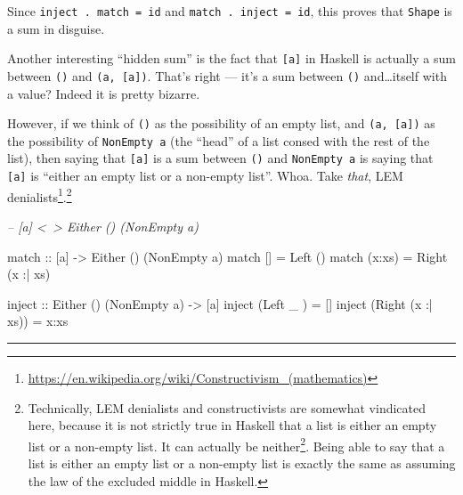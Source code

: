 \documentclass[]{article}
\newenvironment{Shaded}{}{}
\newcommand{\CommentTok}[1]{\textcolor[rgb]{0.38,0.63,0.69}{\textit{#1}}}
\newcommand{\DataTypeTok}[1]{\textcolor[rgb]{0.56,0.13,0.00}{#1}}
\newcommand{\FunctionTok}[1]{\textcolor[rgb]{0.02,0.16,0.49}{#1}}
\newcommand{\NormalTok}[1]{#1}
\newcommand{\OtherTok}[1]{\textcolor[rgb]{0.00,0.44,0.13}{#1}}
\renewcommand{\href}[2]{#2\footnote{\url{#1}}}
\begin{document}
Since \texttt{inject\ .\ match\ =\ id} and \texttt{match\ .\ inject\ =\ id},
this proves that \texttt{Shape} is a sum in disguise.

Another interesting ``hidden sum'' is the fact that \texttt{{[}a{]}} in Haskell
is actually a sum between \texttt{()} and \texttt{(a,\ {[}a{]})}. That's right
--- it's a sum between \texttt{()} and\ldots{}itself with a value? Indeed it is
pretty bizarre.

However, if we think of \texttt{()} as the possibility of an empty list, and
\texttt{(a,\ {[}a{]})} as the possibility of \texttt{NonEmpty\ a} (the ``head''
of a list consed with the rest of the list), then saying that \texttt{{[}a{]}}
is a sum between \texttt{()} and \texttt{NonEmpty\ a} is saying that
\texttt{{[}a{]}} is ``either an empty list or a non-empty list''. Whoa. Take
\emph{that},
\href{https://en.wikipedia.org/wiki/Constructivism_(mathematics)}{LEM
denialists}.\footnote{Technically, LEM denialists and constructivists are
  somewhat vindicated here, because it is not strictly true in Haskell that a
  list is either an empty list or a non-empty list. It can actually
  \href{https://wiki.haskell.org/Bottom}{be neither}. Being able to say that a
  list is either an empty list or a non-empty list is exactly the same as
  assuming the law of the excluded middle in Haskell.}

\begin{Shaded}
\begin{Highlighting}[]
\CommentTok{-- [a] <~> Either () (NonEmpty a)}

\OtherTok{match ::}\NormalTok{ [a] }\OtherTok{->} \DataTypeTok{Either}\NormalTok{ () (}\DataTypeTok{NonEmpty}\NormalTok{ a)}
\NormalTok{match []     }\FunctionTok{=} \DataTypeTok{Left}\NormalTok{  ()}
\NormalTok{match (x}\FunctionTok{:}\NormalTok{xs) }\FunctionTok{=} \DataTypeTok{Right}\NormalTok{ (x }\FunctionTok{:|}\NormalTok{ xs)}

\OtherTok{inject ::} \DataTypeTok{Either}\NormalTok{ () (}\DataTypeTok{NonEmpty}\NormalTok{ a) }\OtherTok{->}\NormalTok{ [a]}
\NormalTok{inject (}\DataTypeTok{Left}\NormalTok{   _       ) }\FunctionTok{=}\NormalTok{ []}
\NormalTok{inject (}\DataTypeTok{Right}\NormalTok{ (x }\FunctionTok{:|}\NormalTok{ xs)) }\FunctionTok{=}\NormalTok{ x}\FunctionTok{:}\NormalTok{xs}
\end{Highlighting}
\end{Shaded}

\begin{center}\rule{0.5\linewidth}{\linethickness}\end{center}
\end{document}
